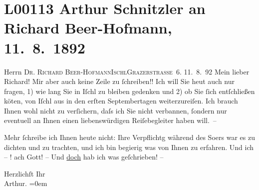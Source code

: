 

\section[Arthur Schnitzler an Richard Beer-Hofmann, 11. 8. 1892]{L00113 Arthur Schnitzler an Richard Beer-Hofmann, 11. 8. 1892}
\nopagebreak{}
\rehead{ }\normalsize\beginnumbering{}
\toendnotes[C]{\smallbreak\pagebreak[2]}
\pstart{}{\pb}Herrn \textsc{Dr. Richard
                     Beer-Hofmann}\pend{}\pstart{}\textsc{Ischl}\pend{}\pstart{}\textsc{Grazerstraße 6}.\pend{}{\bigskip}\vspace{1em}
\pstart
           \raggedleft{}{\pb}11. 8. 92\pend
           \vspace{0.5em}
\pstart
           Mein lieber Richard! Mir aber auch keine Zeile zu ſchreiben!! Ich
               will Sie heut auch nur fragen, 1) wie lang Sie in Iſchl zu bleiben gedenken und 2) ob Sie ſich entſchließen kö{\geminationn}ten, von Iſchl aus
               in den erſten Septembertagen weiterzureiſen. Ich brauch Ihnen wohl nicht zu
               verſichern, daſs ich Sie nicht verbannen, ſondern nur eventuell \introOben{}an
                  Ihnen\introOben{} einen liebenswürdigen Reiſebegleiter haben will. –\pend
           
\pstart
           Mehr ſchreibe ich Ihnen heute nicht: Ihre Verpflichtg während des So{\geminationm}ers war es zu dichten und zu trachten, und ich bin
               begierig was von Ihnen zu erfahren. Und ich – ! ach Gott! – Und \uline{doch} hab ich was geſchrieben! –\pend
           
\pstart
           Herzlichſt Ihr{\\[\baselineskip]}\spacefill\mbox{Arthur.}\pend
           \leftskip=0em{}\endnumbering{}  
      
